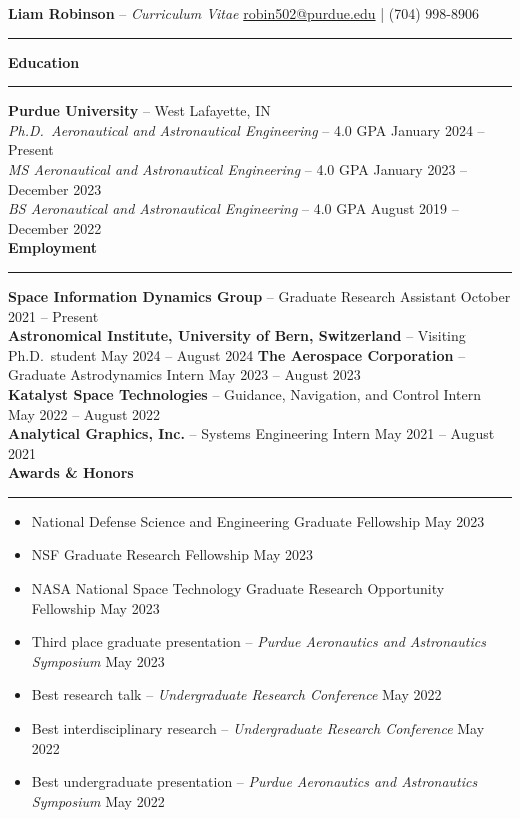 \documentclass[11pt, a4paper]{article}
\newcommand{\github}[1]{%
   \href{#1}{\faGithub}%
}
\newcommand{\yt}[1]{%
   \href{#1}{\faYoutube}%
}
\newcommand{\sectiontitle}[1]{{\Large \textbf{#1}}\vspace{0.5em}\hrule\vspace{0.5em}}
\begin{document}
\thispagestyle{empty}

\sffamily

\noindent
\textbf{\huge Liam Robinson} \github{https://github.com/ljrobins} \yt{https://www.youtube.com/channel/UCqM4avrjDiO7ji1Q2nn7vKQ} -- \textit{\huge Curriculum Vitae} \hfill \href{mailto:robin502@purdue.edu}{robin502@purdue.edu} | (704) 998-8906
\rule{\linewidth}{4pt}
\vspace{-0.5em}

\sectiontitle{Education}
\textbf{Purdue University} -- West Lafayette, IN \\
\textit{Ph.D.\ Aeronautical and Astronautical Engineering} -- 4.0 GPA \hfill January 2024 -- Present \\
\textit{MS Aeronautical and Astronautical Engineering} -- 4.0 GPA \hfill January 2023 -- December 2023 \\
\textit{BS Aeronautical and Astronautical Engineering} -- 4.0 GPA \hfill August 2019 -- December 2022 \\

\sectiontitle{Employment}
\textbf{Space Information Dynamics Group} -- Graduate Research Assistant \hfill October 2021 -- Present \\
\textbf{Astronomical Institute, University of Bern, Switzerland} -- Visiting Ph.D.\ student \hfill May 2024 -- August 2024
\textbf{The Aerospace Corporation} -- Graduate Astrodynamics Intern \hfill May 2023 -- August 2023 \\
\textbf{Katalyst Space Technologies} -- Guidance, Navigation, and Control Intern \hfill May 2022 -- August 2022 \\
\textbf{Analytical Graphics, Inc.} -- Systems Engineering Intern \hfill May 2021 -- August 2021 \\


\sectiontitle{Awards \& Honors}
\begin{itemize}[noitemsep]
    \item National Defense Science and Engineering Graduate Fellowship \hfill May 2023
    \item NSF Graduate Research Fellowship \hfill May 2023
    \item NASA National Space Technology Graduate Research Opportunity Fellowship \hfill May 2023
    \item Third place graduate presentation -- \textit{Purdue Aeronautics and Astronautics Symposium} \hfill May 2023
    \item Best research talk -- \textit{Undergraduate Research Conference} \hfill May 2022
    \item Best interdisciplinary research -- \textit{Undergraduate Research Conference} \hfill May 2022
    \item Best undergraduate presentation -- \textit{Purdue Aeronautics and Astronautics Symposium} \hfill May 2022
\end{itemize}
\end{document}
